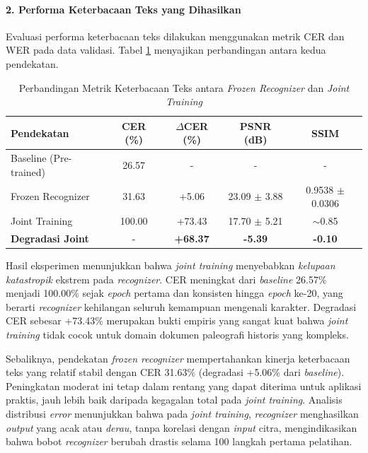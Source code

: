 \documentclass[12pt,a4paper]{article}
\begin{document}
\vspace{0.5em}

\paragraph{2. Performa Keterbacaan Teks yang Dihasilkan}

Evaluasi performa keterbacaan teks dilakukan menggunakan metrik CER dan WER pada data validasi. Tabel \ref{tab:frozen-vs-joint-cer} menyajikan perbandingan antara kedua pendekatan.

\begin{table}[H]
\centering
\caption{Perbandingan Metrik Keterbacaan Teks antara \textit{Frozen Recognizer} dan \textit{Joint Training}}
\label{tab:frozen-vs-joint-cer}
\begin{tabular}{lcccc}
\toprule
\textbf{Pendekatan} & \textbf{CER (\%)} & \textbf{$\Delta$CER (\%)} & \textbf{PSNR (dB)} & \textbf{SSIM} \\
\midrule
Baseline (Pre-trained) & 26.57 & - & - & - \\
Frozen Recognizer & 31.63 & +5.06 & 23.09 $\pm$ 3.88 & 0.9538 $\pm$ 0.0306 \\
Joint Training & 100.00 & +73.43 & 17.70 $\pm$ 5.21 & $\sim$0.85 \\
\midrule
\textbf{Degradasi Joint} & - & \textbf{+68.37} & \textbf{-5.39} & \textbf{-0.10} \\
\bottomrule
\end{tabular}
\end{table}

Hasil eksperimen menunjukkan bahwa \textit{joint training} menyebabkan \textit{kelupaan katastropik} ekstrem pada \textit{recognizer}. CER meningkat dari \textit{baseline} 26.57\% menjadi 100.00\% sejak \textit{epoch} pertama dan konsisten hingga \textit{epoch} ke-20, yang berarti \textit{recognizer} kehilangan seluruh kemampuan mengenali karakter. Degradasi CER sebesar +73.43\% merupakan bukti empiris yang sangat kuat bahwa \textit{joint training} tidak cocok untuk domain dokumen paleografi historis yang kompleks.

Sebaliknya, pendekatan \textit{frozen recognizer} mempertahankan kinerja keterbacaan teks yang relatif stabil dengan CER 31.63\% (degradasi +5.06\% dari \textit{baseline}). Peningkatan moderat ini tetap dalam rentang yang dapat diterima untuk aplikasi praktis, jauh lebih baik daripada kegagalan total pada \textit{joint training}. Analisis distribusi \textit{error} menunjukkan bahwa pada \textit{joint training}, \textit{recognizer} menghasilkan \textit{output} yang acak atau \textit{derau}, tanpa korelasi dengan \textit{input} citra, mengindikasikan bahwa bobot \textit{recognizer} berubah drastis selama 100 langkah pertama pelatihan.
\end{document}
